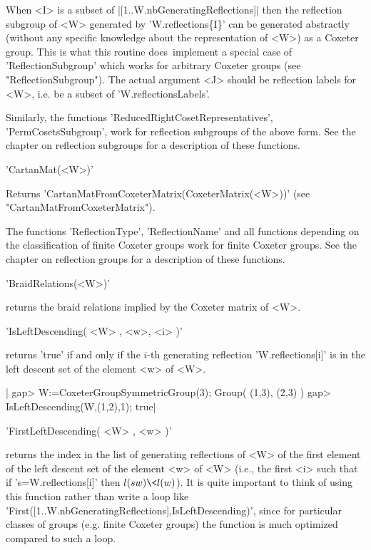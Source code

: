 When  <I>  is  a  subset of  |[1..W.nbGeneratingReflections]|  then  the
reflection  subgroup  of  <W>   generated  by  'W.reflections\{I\}'  can
be  generated  abstractly  (without  any specific  knowledge  about  the
representation of  <W>) as a  Coxeter group.  This is what  this routine
does\:\  implement a  special case  of 'ReflectionSubgroup'  which works
for  arbitrary Coxeter  groups  (see  "ReflectionSubgroup"). The  actual
argument <J>  should be reflection labels  for <W>, i.e. be  a subset of
'W.reflectionsLabels'.

Similarly,     the     functions     'ReducedRightCosetRepresentatives',
'PermCosetsSubgroup', work  for reflection subgroups of  the above form.
See  the chapter  on reflection  subgroups  for a  description of  these
functions.

'CartanMat(<W>)'

Returns       'CartanMatFromCoxeterMatrix(CoxeterMatrix(<W>))'      (see
"CartanMatFromCoxeterMatrix").

The  functions  'ReflectionType',  'ReflectionName'  and  all  functions
depending on the classification of finite Coxeter groups work for finite
Coxeter groups. See  the chapter on reflection groups  for a description
of these functions.

'BraidRelations(<W>)'

returns the braid relations implied by the Coxeter matrix of <W>.


'IsLeftDescending( <W> , <w>, <i> )'

returns  'true'  if  and  only   if  the  $i$-th  generating  reflection
'W.reflections[i]' is in the left descent set of the element <w> of <W>.

|    gap> W:=CoxeterGroupSymmetricGroup(3);
    Group( (1,3), (2,3) )
    gap> IsLeftDescending(W,(1,2),1);
    true|



'FirstLeftDescending( <W> , <w> )'

returns the  index in the list  of generating reflections of  <W> of the
first element of the  left descent set of the element  <w> of <W> (i.e.,
the first <i> such that  if 's=W.reflections[i]' then $l(sw)\<l(w)$). It
is quite  important to think  of using  this function rather  than write
a  loop  like  'First([1..W.nbGeneratingReflections],IsLeftDescending)',
since for particular classes of  groups (e.g. finite Coxeter groups) the
function is much optimized compared to such a loop.

